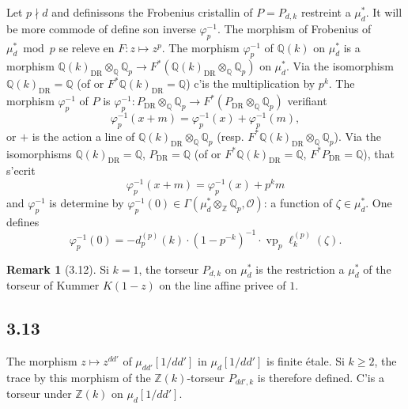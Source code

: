 \documentclass[12pt,a4paper]{article}
\theoremstyle{plain}
\theoremstyle{definition}
\newtheorem{remark}[theorem]{Remark}
\theoremstyle{remark}
\providecommand{\DR}{\mathrm{DR}}
\begin{document}
Let $p \nmid d$ and definissons the Frobenius cristallin of $P = P_{d,k}$ restreint a
$\mu_d^*$. It will be more commode of define son inverse $\varphi_p^{-1}$. The morphism of
Frobenius of $\mu_d^* \bmod p$ se releve en $F: z \mapsto z^p$. The morphism
$\varphi_p^{-1}$ of $\mathbb{Q}(k)$ on $\mu_d^*$ is a morphism
$\mathbb{Q}(k)_{\DR} \otimes_{\mathbb{Q}} \mathbb{Q}_p \to
F^*(\mathbb{Q}(k)_{\DR} \otimes_{\mathbb{Q}} \mathbb{Q}_p)$ on $\mu_d^*$.
Via the isomorphism $\mathbb{Q}(k)_{\DR} = \mathbb{Q}$ (of or
$F^*\mathbb{Q}(k)_{\DR} = \mathbb{Q}$) c'is the multiplication by $p^k$. The morphism
$\varphi_p^{-1}$ of $P$ is $\varphi_p^{-1}: P_{\DR} \otimes_{\mathbb{Q}} \mathbb{Q}_p \to
F^*(P_{\DR} \otimes_{\mathbb{Q}} \mathbb{Q}_p)$ verifiant
\[
\varphi_p^{-1}(x + m) = \varphi_p^{-1}(x) + \varphi_p^{-1}(m),
\]
or $+$ is the action a line of $\mathbb{Q}(k)_{\DR} \otimes_{\mathbb{Q}} \mathbb{Q}_p$
(resp. $F^*\mathbb{Q}(k)_{\DR} \otimes_{\mathbb{Q}} \mathbb{Q}_p$). Via the isomorphisms
$\mathbb{Q}(k)_{\DR} = \mathbb{Q}$, $P_{\DR} = \mathbb{Q}$ (of or
$F^*\mathbb{Q}(k)_{\DR} = \mathbb{Q}$, $F^* P_{\DR} = \mathbb{Q}$), that s'ecrit
\[
\varphi_p^{-1}(x + m) = \varphi_p^{-1}(x) + p^k m
\]
and $\varphi_p^{-1}$ is determine by $\varphi_p^{-1}(0) \in
\Gamma(\mu_d^* \otimes_{\mathbb{Z}} \mathbb{Q}_p, \mathcal{O})$: a function of $\zeta \in
\mu_d^*$. One defines
\begin{equation}\label{eq:3.11.4}
\varphi_p^{-1}(0) = -d_p^{(p)}(k) \cdot (1 - p^{-k})^{-1} \cdot
\operatorname{vp}_p \ell_k^{(p)}(\zeta).
\end{equation}

\begin{remark}[3.12]\label{rem:3.12}
Si $k = 1$, the torseur $P_{d,k}$ on $\mu_d^*$ is the restriction a $\mu_d^*$ of the
torseur of Kummer $K(1-z)$ on the line affine privee of $1$.
\end{remark}

\subsection*{3.13}

The morphism $z \mapsto z^{dd'}$ of $\mu_{dd'}[1/dd']$ in $\mu_d[1/dd']$ is finite
étale. Si $k \geq 2$, the trace by this morphism of the $\mathbb{Z}(k)$-torseur $P_{dd',k}$
is therefore defined. C'is a torseur under $\mathbb{Z}(k)$ on $\mu_d[1/dd']$.
\end{document}

